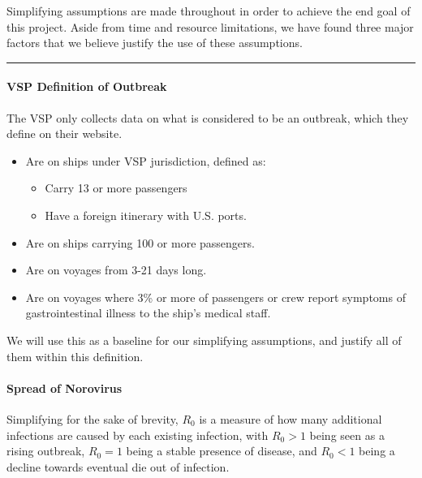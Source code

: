 \documentclass[
  11,
]{book}
\begin{document}
Simplifying assumptions are made throughout in order to achieve the end goal of this project. Aside from time and resource limitations, we have found three major factors that we believe justify the use of these assumptions.

\begin{center}\rule{0.5\linewidth}{0.5pt}\end{center}

\hypertarget{vsp-definition-of-outbreak}{%
\paragraph*{VSP Definition of Outbreak}\label{vsp-definition-of-outbreak}}

The VSP only collects data on what is considered to be an outbreak, which they define on their website.

\begin{itemize}
\item
  Are on ships under VSP jurisdiction, defined as:

  \begin{itemize}
  \item
    Carry 13 or more passengers
  \item
    Have a foreign itinerary with U.S. ports.
  \end{itemize}
\item
  Are on ships carrying 100 or more passengers.
\item
  Are on voyages from 3-21 days long.
\item
  Are on voyages where 3\% or more of passengers or crew report symptoms of gastrointestinal illness to the ship's medical staff.
\end{itemize}

We will use this as a baseline for our simplifying assumptions, and justify all of them within this definition.

\hypertarget{spread-of-norovirus}{%
\paragraph*{Spread of Norovirus}\label{spread-of-norovirus}}

Simplifying for the sake of brevity, \(R_0\) is a measure of how many additional infections are caused by each existing infection, with \(R_0 > 1\) being seen as a rising outbreak, \(R_0 = 1\) being a stable presence of disease, and \(R_0 < 1\) being a decline towards eventual die out of infection.
\end{document}
